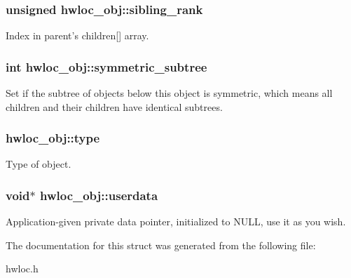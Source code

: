 \hypertarget{a00016_aaa6043eee6f55869933c1d974efd9acd}{
\subsubsection[{sibling\_\-rank}]{\setlength{\rightskip}{0pt plus 5cm}unsigned {\bf hwloc\_\-obj::sibling\_\-rank}}}
\label{a00016_aaa6043eee6f55869933c1d974efd9acd}


Index in parent's {\ttfamily children}\mbox{[}\mbox{]} array. 

\hypertarget{a00016_a0f41a1d67dc6b661906f2217563637f3}{
\subsubsection[{symmetric\_\-subtree}]{\setlength{\rightskip}{0pt plus 5cm}int {\bf hwloc\_\-obj::symmetric\_\-subtree}}}
\label{a00016_a0f41a1d67dc6b661906f2217563637f3}


Set if the subtree of objects below this object is symmetric, which means all children and their children have identical subtrees. 

\hypertarget{a00016_acc4f0803f244867e68fe0036800be5de}{
\subsubsection[{type}]{ {\bf hwloc\_\-obj::type}}}
\label{a00016_acc4f0803f244867e68fe0036800be5de}


Type of object. 

\hypertarget{a00016_a76fd3ac94401cf32dfccc3a3a8de68a5}{
\subsubsection[{userdata}]{\setlength{\rightskip}{0pt plus 5cm}void$\ast$ {\bf hwloc\_\-obj::userdata}}}
\label{a00016_a76fd3ac94401cf32dfccc3a3a8de68a5}


Application-\/given private data pointer, initialized to {\ttfamily NULL}, use it as you wish. 



The documentation for this struct was generated from the following file:\begin{DoxyCompactItemize}
\item 
hwloc.h\end{DoxyCompactItemize}
